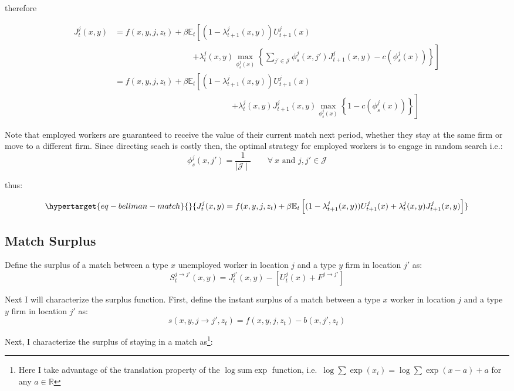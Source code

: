 \documentclass[
  letterpaper,
  DIV=11,
  numbers=noendperiod]{scrreprt}
\begin{document}
therefore

\begin{align*}
    J^j_{t}(x,y)&=f(x,y,j,z_t)+\beta \mathbb{E}_t\left[(1 - \lambda^j_{t+1}(x,y))U^{j}_{t+1}(x) \right. \\& \hspace{4cm} \left. +  \lambda^j_t(x,y) \max_{\phi^j_s(x)}\left\{ \sum_{j'\in\mathcal{J}}\phi_s^j(x,j')J^j_{t+1}(x,y) - c(\phi^j_s(x))\right\} \right] \\
    &=f(x,y,j,z_t)+\beta \mathbb{E}_t\left[(1 - \lambda^j_{t+1}(x,y))U^j_{t+1}(x) \right. \\& \hspace{6cm} \left. +  \lambda^j_t(x,y) J^j_{t+1}(x,y)\max_{\phi^j_s(x)}\left\{1 - c(\phi^j_s(x))\right\} \right]
\end{align*}

Note that employed workers are guaranteed to receive the value of their
current match next period, whether they stay at the same firm or move to
a different firm. Since directing seach is costly then, the optimal
strategy for employed workers is to engage in random search i.e.:
\[\phi_{s}^{j}(x, j') = \frac{1}{\mid\mathcal{J}\mid} \qquad \forall\:x \text{ and }j,j'\in\mathcal{J}\]

thus:

\begin{equation}\protect\hypertarget{eq-bellman-match}{}{J^j_{t}(x,y)=f(x,y,j,z_t)+\beta\mathbb{E}_t\left[(1 - \lambda^j_{t+1}(x,y))U^{j}_{t+1}(x) + \lambda^j_t(x,y)J^j_{t+1}(x,y)\right]}\label{eq-bellman-match}\end{equation}

\hypertarget{match-surplus}{%
\subsection{Match Surplus}\label{match-surplus}}

Define the surplus of a match between a type \(x\) unemployed worker in
location \(j\) and a type \(y\) firm in location \(j'\) as:
\[S^{j\to j'}_{t}(x,y) = J^{j'}_{t}(x,y) - [U^{j}_t(x) + F^{j\to j'}]\]

Next I will characterize the surplus function. First, define the instant
surplus of a match between a type \(x\) worker in location \(j\) and a
type \(y\) firm in location \(j'\) as:
\[s(x,y,j \to j',z_t) = f(x,y,j,z_t) - b(x,j',z_t)\]

Next, I characterize the surplus of staying in a match as\footnote{Here
  I take advantage of the translation property of the
  \(\log\text{sum}\exp\) function,
  i.e.~\(\log\sum\exp(x_i) = \log\sum\exp(x - a)+ a\) for any
  \(a\in\mathbb{R}\)}:
\end{document}
